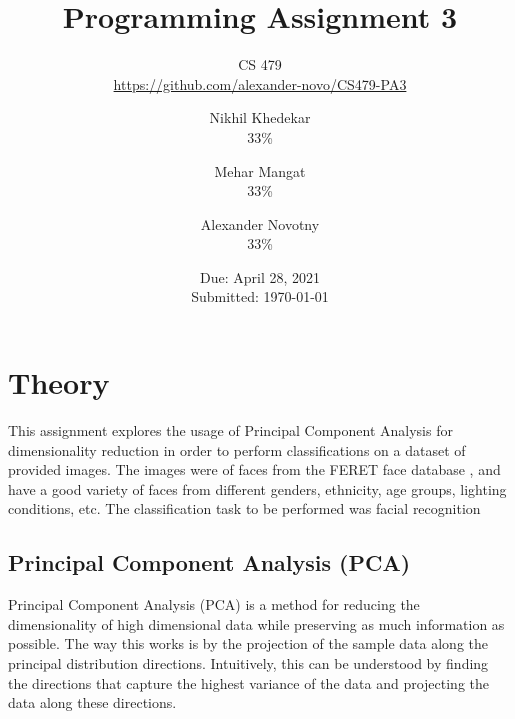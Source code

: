 \documentclass[headings=optiontoheadandtoc,listof=totoc,parskip=full]{scrartcl}
\title{Programming Assignment 3}
\subtitle{CS 479\\\url{https://github.com/alexander-novo/CS479-PA3}}
\author{Nikhil Khedekar\\33\%\\\Cref{sec:theory} \and Mehar Mangat\\33\%\\\Cref{sec:theory} \and Alexander Novotny\\33\%\\\Cref{sec:impl,sec:results}}
\date{Due: April 28, 2021 \\ Submitted: \today}
\begin{document}
\maketitle
\tableofcontents
{}

\newpage
{}


\section{Theory}
\label{sec:theory}

This assignment explores the usage of Principal Component Analysis for dimensionality reduction in order to perform classifications on a dataset of provided images. The images were of faces from the FERET face database \cite{feretdataset}, and have a good variety of faces from different genders, ethnicity, age groups, lighting conditions, etc. The classification task to be performed was facial recognition

\subsection{Principal Component Analysis (PCA)}
\label{sec:theory-pca}
Principal Component Analysis (PCA) is a method for reducing the dimensionality of high dimensional data while preserving as much information as possible. The way this works is by the projection of the sample data along the principal distribution directions. Intuitively, this can be understood by finding the directions that capture the highest variance of the data and projecting the data along these directions. 
\end{document}
